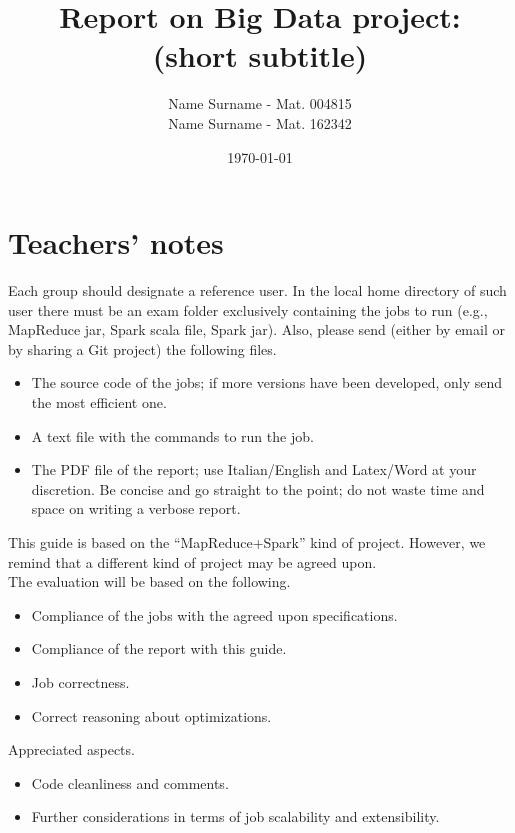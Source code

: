 \documentclass[10pt]{article}
\title{\textbf{Report on Big Data project: \\(short subtitle)}}
\author{
	Name Surname - Mat. 004815\\
	Name Surname - Mat. 162342}
\date{\today}
\begin{document}
\maketitle
\newpage

\tableofcontents

\newpage

\section{Teachers' notes}

Each group should designate a reference user. In the local home directory of such user there must be an {\sf exam} folder exclusively containing the jobs to run (e.g., MapReduce jar, Spark scala file, Spark jar). Also, please send (either by email or by sharing a Git project) the following files.

\begin{itemize}
\item The source code of the jobs; if more versions have been developed, only send the most efficient one.
\item A text file with the commands to run the job.
\item The PDF file of the report; use Italian/English and Latex/Word at your discretion. Be concise and go straight to the point; do not waste time and space on writing a verbose report.
\end{itemize}

This guide is based on the ``MapReduce+Spark'' kind of project. However, we remind that a different kind of project may be agreed upon.
\\

The evaluation will be based on the following.
\begin{itemize}
\item Compliance of the jobs with the agreed upon specifications.
\item Compliance of the report with this guide.
\item Job correctness.
\item Correct reasoning about optimizations.
\end{itemize}

Appreciated aspects.
\begin{itemize}
\item Code cleanliness and comments.
\item Further considerations in terms of job scalability and extensibility.
\end{itemize}
\end{document}
